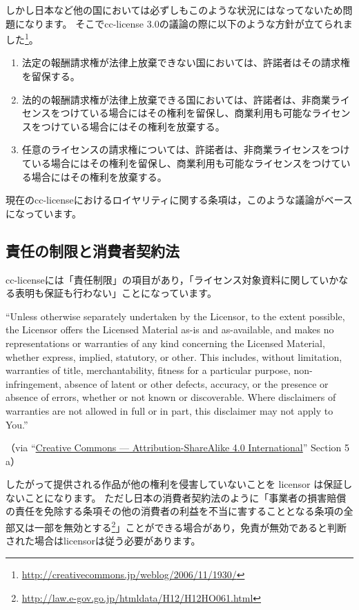 \documentclass{ltjsarticle}
\begin{document}
しかし日本など他の国においては必ずしもこのような状況にはなってないため問題になります。
そこでcc-license 3.0の議論の際に以下のような方針が立てられました\footnote{\url{http://creativecommons.jp/weblog/2006/11/1930/}}。
\begin{enumerate}
\item 法定の報酬請求権が法律上放棄できない国においては、許諾者はその請求権を留保する。
\item 法的の報酬請求権が法律上放棄できる国においては、許諾者は、非商業ライセンスをつけている場合にはその権利を留保し、商業利用も可能なライセンスをつけている場合にはその権利を放棄する。
\item 任意のライセンスの請求権については、許諾者は、非商業ライセンスをつけている場合にはその権利を留保し、商業利用も可能なライセンスをつけている場合にはその権利を放棄する。
\end{enumerate}
現在のcc-licenseにおけるロイヤリティに関する条項は，このような議論がベースになっています。


\subsection{責任の制限と消費者契約法}

cc-licenseには「責任制限」の項目があり，「ライセンス対象資料に関していかなる表明も保証も行わない」ことになっています。
\begin{mdframed}
``Unless otherwise separately undertaken by the Licensor, to the extent possible, the Licensor offers the Licensed Material as-is and as-available, and makes no representations or warranties of any kind concerning the Licensed Material, whether express, implied, statutory, or other. This includes, without limitation, warranties of title, merchantability, fitness for a particular purpose, non-infringement, absence of latent or other defects, accuracy, or the presence or absence of errors, whether or not known or discoverable. Where disclaimers of warranties are not allowed in full or in part, this disclaimer may not apply to You.'' \par
（via ``\href{http://creativecommons.org/licenses/by-sa/4.0/legalcode}{Creative Commons — Attribution-ShareAlike 4.0 International}'' Section 5 a）
\end{mdframed}
したがって提供される作品が他の権利を侵害していないことを licensor は保証しないことになります。
ただし日本の消費者契約法のように「事業者の損害賠償の責任を免除する条項その他の消費者の利益を不当に害することとなる条項の全部又は一部を無効とする\footnote{\url{http://law.e-gov.go.jp/htmldata/H12/H12HO061.html}}」ことができる場合があり，免責が無効であると判断された場合はlicensorは従う必要があります。
\end{document}
